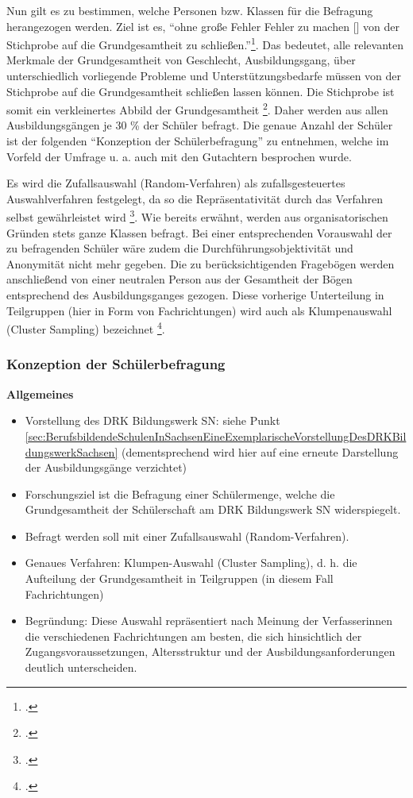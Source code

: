 Nun gilt es zu bestimmen, welche Personen bzw. Klassen für die Befragung herangezogen werden. Ziel ist es, "`ohne große Fehler Fehler zu machen [\punkte] von der Stichprobe auf die Grundgesamtheit zu schließen."'\footcite[60]{Mayer2013}. Das bedeutet, alle relevanten Merkmale der Grundgesamtheit von Geschlecht, Ausbildungsgang, über unterschiedlich vorliegende Probleme und Unterstützungsbedarfe müssen von der Stichprobe auf die Grundgesamtheit schließen lassen können. Die Stichprobe ist somit ein verkleinertes Abbild der Grundgesamtheit \footcite [vgl.][197]{Kromrey1995}. Daher werden aus allen Ausbildungsgängen je 30 \% der Schüler befragt. Die genaue Anzahl der Schüler ist der folgenden "`Konzeption der Schülerbefragung"' zu entnehmen, welche im Vorfeld der Umfrage u. a. auch mit den Gutachtern besprochen wurde.

Es wird die Zufallsauswahl (Random-Verfahren) als zufallsgesteuertes Auswahlverfahren festgelegt, da so die Repräsentativität durch das Verfahren selbst gewährleistet wird \footcite[vgl.][60]{Mayer2013}. Wie bereits erwähnt, werden aus organisatorischen Gründen stets ganze Klassen befragt. Bei einer entsprechenden Vorauswahl der zu befragenden Schüler wäre zudem die Durchführungsobjektivität und Anonymität nicht mehr gegeben. Die zu berücksichtigenden Fragebögen werden anschließend von einer neutralen Person aus der Gesamtheit der Bögen entsprechend des Ausbildungsganges gezogen. Diese vorherige Unterteilung in Teilgruppen (hier in Form von Fachrichtungen) wird auch als Klumpenauswahl (Cluster Sampling) bezeichnet \footcite[vgl.][63]{Mayer2013}.

\subsubsection{Konzeption der Schülerbefragung}
\label{sec:KonzeptionDerSchülerbefragung}

\textbf{Allgemeines}
\begin{itemize}
	\item Vorstellung des DRK Bildungswerk SN: siehe Punkt \ref{sec:BerufsbildendeSchulenInSachsenEineExemplarischeVorstellungDesDRKBildungswerkSachsen} (dementsprechend wird hier auf eine erneute Darstellung der Ausbildungsgänge verzichtet)
	\item Forschungsziel ist die Befragung einer Schülermenge, welche die Grundgesamtheit der Schülerschaft am DRK Bildungswerk SN widerspiegelt.
	\item Befragt werden soll mit einer Zufallsauswahl (Random-Verfahren).
	\item Genaues Verfahren: Klumpen-Auswahl (Cluster Sampling), d. h. die Aufteilung der Grundgesamtheit in Teilgruppen (in diesem Fall Fachrichtungen) 
	\item Begründung: Diese Auswahl repräsentiert nach Meinung der Verfasserinnen die verschiedenen Fachrichtungen am besten, die sich hinsichtlich der Zugangsvoraussetzungen, Altersstruktur und der Ausbildungsanforderungen deutlich unterscheiden.
\end{itemize}

